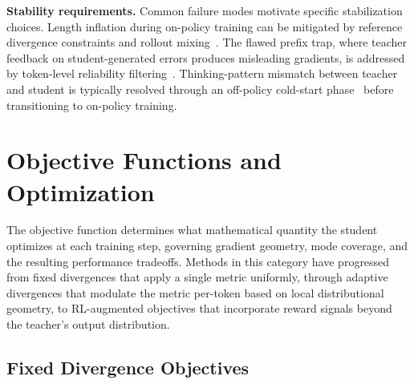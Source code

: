 \documentclass{article} %
\begin{document}
\textbf{Stability requirements.} Common failure modes motivate specific stabilization choices. Length inflation during on-policy training can be mitigated by reference divergence constraints and rollout mixing~\citep{2604.08527}. The flawed prefix trap, where teacher feedback on student-generated errors produces misleading gradients, is addressed by token-level reliability filtering~\citep{2604.14084,2604.10688}. Thinking-pattern mismatch between teacher and student is typically resolved through an off-policy cold-start phase~\citep{2604.13016} before transitioning to on-policy training.

\section{Objective Functions and Optimization}
\label{sec:objectives}

The objective function determines what mathematical quantity the student optimizes at each training step, governing gradient geometry, mode coverage, and the resulting performance tradeoffs. Methods in this category have progressed from fixed divergences that apply a single metric uniformly, through adaptive divergences that modulate the metric per-token based on local distributional geometry, to RL-augmented objectives that incorporate reward signals beyond the teacher's output distribution.

\subsection{Fixed Divergence Objectives}
\label{subsec:fixed_div}
\end{document}
